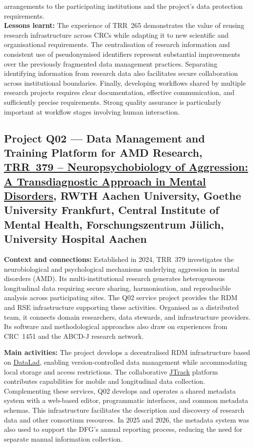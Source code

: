 \documentclass{eceasst}
\begin{document}
arrangements to the participating institutions
and the project's data protection requirements.
\\
\noindent\textbf{Lessons learnt:}
The experience of TRR~265 demonstrates the value
of reusing research infrastructure
across CRCs while adapting it to new scientific
and organisational requirements.
The centralisation of research information and
consistent use of pseudonymised identifiers
represent substantial improvements over the
previously fragmented data management practices.
Separating identifying information from research
data also facilitates secure collaboration
across institutional boundaries.
Finally, developing workflows shared by multiple
research projects requires clear documentation,
effective communication, and sufficiently precise
requirements. Strong quality assurance is
particularly important at workflow stages
involving human interaction.
\subsection{Project Q02 --- Data Management and Training Platform for AMD Research,
\href{https://gepris.dfg.de/gepris/projekt/512007073?language=en}
{TRR~379 -- Neuropsychobiology of Aggression: A Transdiagnostic Approach in Mental Disorders},
RWTH Aachen University, Goethe University Frankfurt,
Central Institute of Mental Health, Forschungszentrum Jülich,
University Hospital Aachen}
\label{subsec:trr379}

\noindent\textbf{Context and connections:}
Established in 2024, TRR~379 investigates the neurobiological
and psychological mechanisms underlying aggression in mental
disorders (AMD). Its multi-institutional research generates
heterogeneous longitudinal data requiring secure sharing,
harmonisation, and reproducible analysis across participating
sites.
The Q02 service project provides the RDM and RSE infrastructure
supporting these activities. Organised as a distributed team,
it connects domain researchers, data stewards, and
infrastructure providers. Its software and methodological
approaches also draw on experiences from CRC~1451 and
the ABCD-J research network.

\medskip
\noindent\textbf{Main activities:}
The project develops a decentralised RDM infrastructure
based on \href{https://www.datalad.org/}{DataLad},
enabling version-controlled data management while
accommodating local storage and access restrictions.
The collaborative \href{https://jtrack.readthedocs.io/en/latest/} {JTrack} platform contributes capabilities for mobile
and longitudinal data collection.
Complementing these services, Q02 develops and operates
a shared metadata system with a web-based editor,
programmatic interfaces, and common metadata schemas.
This infrastructure facilitates the description and
discovery of research data and other consortium resources.
In 2025 and 2026, the metadata system was also used to support
the DFG's annual reporting process, reducing the need
for separate manual information collection.
\end{document}
